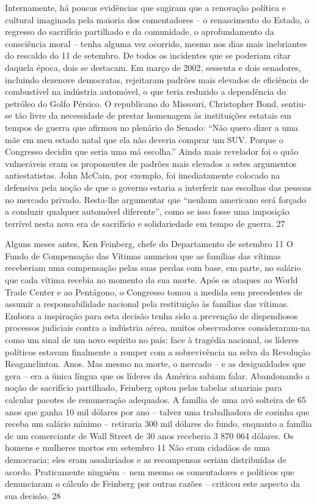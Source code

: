 Internamente, há poucas evidências que sugiram que a renovação política e cultural imaginada pela maioria dos comentadores – o renascimento do Estado, o regresso do sacrifício partilhado e da comunidade, o aprofundamento da consciência moral – tenha alguma vez ocorrido, mesmo nos dias mais inebriantes do rescaldo do 11 de setembro. De todos os incidentes que se poderiam citar daquela época, dois se destacam. Em março de 2002, sessenta e dois senadores, incluindo dezenove democratas, rejeitaram padrões mais elevados de eficiência de combustível na indústria automóvel, o que teria reduzido a dependência do petróleo do Golfo Pérsico. O republicano do Missouri, Christopher Bond, sentiu-se tão livre da necessidade de prestar homenagem às instituições estatais em tempos de guerra que afirmou no plenário do Senado: “Não quero dizer a uma mãe em meu estado natal que ela não deveria comprar um SUV. Porque o Congresso decidiu que seria uma má escolha.” Ainda mais revelador foi o quão vulneráveis ​​eram os proponentes de padrões mais elevados a estes argumentos antiestatistas. John McCain, por exemplo, foi imediatamente colocado na defensiva pela noção de que o governo estaria a interferir nas escolhas das pessoas no mercado privado. Resta-lhe argumentar que “nenhum americano será forçado a conduzir qualquer automóvel diferente”, como se isso fosse uma imposição terrível nesta nova era de sacrifício e solidariedade em tempo de guerra.
 {\color{blue} 27}  

 
\par
 
Alguns meses antes, Ken Feinberg, chefe do Departamento de setembro
 {\color{blue} 11}  
O Fundo de Compensação das Vítimas anunciou que as famílias das vítimas receberiam uma compensação pelas suas perdas com base, em parte, no salário que cada vítima recebia no momento da sua morte. Após os ataques ao World Trade Center e ao Pentágono, o Congresso tomou a medida sem precedentes de assumir a responsabilidade nacional pela restituição às famílias das vítimas. Embora a inspiração para esta decisão tenha sido a prevenção de dispendiosos processos judiciais contra a indústria aérea, muitos observadores consideraram-na como um sinal de um novo espírito no país: face à tragédia nacional, os líderes políticos estavam finalmente a romper com a sobrevivência na selva da Revolução Reaganclinton. Anos. Mas mesmo na morte, o mercado – e as desigualdades que gera – era a única língua que os líderes da América sabiam falar. Abandonando a noção de sacrifício partilhado, Feinberg optou pelas tabelas atuariais para calcular pacotes de remuneração adequados. A família de uma avó solteira de 65 anos que ganha 10 mil dólares por ano – talvez uma trabalhadora de cozinha que receba um salário mínimo – retiraria 300 mil dólares do fundo, enquanto a família de um comerciante de Wall Street de 30 anos receberia 3 870 064 dólares. Os homens e mulheres mortos em setembro
 {\color{blue} 11}  
Não eram cidadãos de uma democracia; eles eram assalariados e as recompensas seriam distribuídas de acordo. Praticamente ninguém – nem mesmo os comentadores e políticos que denunciaram o cálculo de Feinberg por outras razões – criticou este aspecto da sua decisão.
 {\color{blue} 28}  

